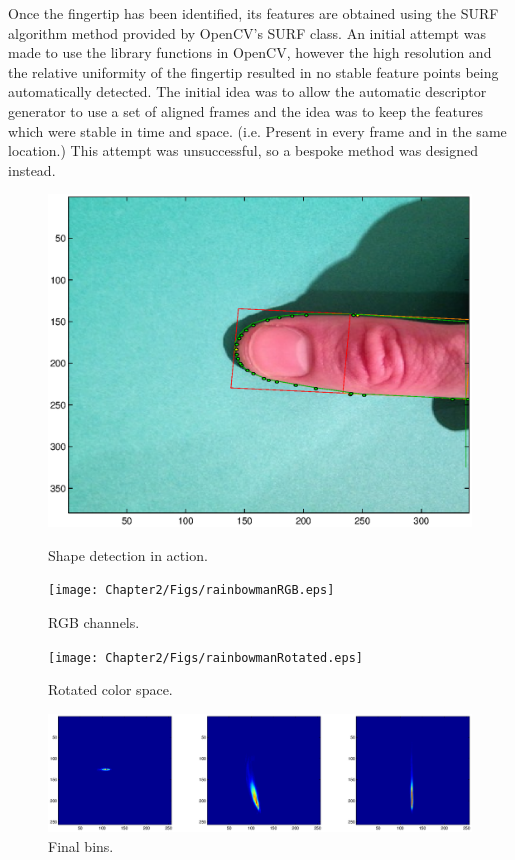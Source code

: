 Once the fingertip has been identified, its features are obtained using the SURF algorithm method provided by OpenCV's SURF class. An initial attempt was made to use the library functions in OpenCV, however the high resolution and the relative uniformity of the fingertip resulted in no stable feature points being automatically detected. The initial idea was to allow the automatic descriptor generator to use a set of aligned frames and the idea was to keep the features which were stable in time and space. (i.e. Present in every frame and in the same location.) This attempt was unsuccessful, so a bespoke method was designed instead.

\begin{figure}[h!]
  \centering
    \includegraphics[width=\textwidth]{Chapter2/Figs/shapeDetection.eps}\label{fig:shapeDetection}
    \caption{Shape detection in action.}
\end{figure}

\begin{figure}[h!]
  \centering
    \texttt{[image: Chapter2/Figs/rainbowmanRGB.eps]}
    \caption{RGB channels.}
\end{figure}

\begin{figure}[h!]
  \centering
    \texttt{[image: Chapter2/Figs/rainbowmanRotated.eps]}
    \caption{Rotated color space.}
\end{figure}

\begin{figure}[h!]
  \centering
    \includegraphics[width=\textwidth]{Chapter2/Figs/binsFinal2.eps}
    \caption{Final bins.}
\end{figure}

